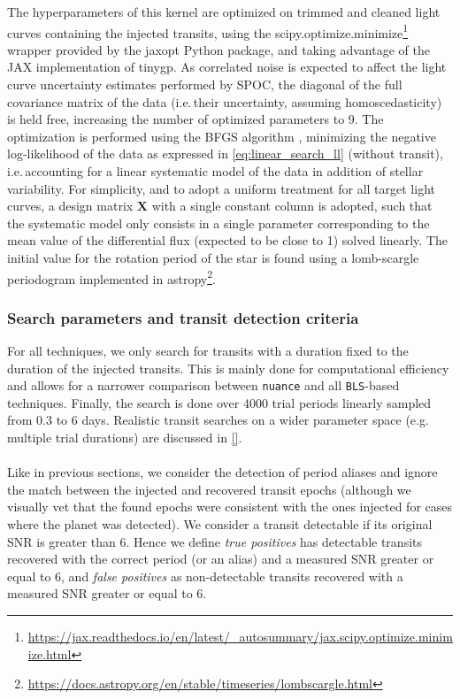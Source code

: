 \documentclass[modern]{aastex631}
\newcommand{\footlink}[1]{\footnote{\url{#1}}}
\begin{document}
The hyperparameters of this kernel are optimized on trimmed and cleaned light curves containing the injected transits, using the \textsf{scipy.optimize.minimize}\footlink{https://jax.readthedocs.io/en/latest/_autosummary/jax.scipy.optimize.minimize.html} wrapper provided by the \textsf{jaxopt} Python package, and taking advantage of the \textsf{JAX} implementation of \textsf{tinygp}. As correlated noise is expected to affect the light curve uncertainty estimates performed by SPOC, the diagonal of the full covariance matrix of the data (i.e.\,their uncertainty, assuming homoscedasticity) is held free, increasing the number of optimized parameters to 9. The optimization is performed using the \textsf{BFGS} algorithm \citep{Fletcher1987}, minimizing the negative log-likelihood of the data as expressed in \autoref{eq:linear_search_ll} (without transit), i.e.\,accounting for a linear systematic model of the data in addition of stellar variability. For simplicity, and to adopt a uniform treatment for all target light curves, a design matrix $\bm{X}$ with a single constant column is adopted, such that the systematic model only consists in a single parameter corresponding to the mean value of the differential flux (expected to be close to 1) solved linearly. The initial value for the rotation period of the star is found using a lomb-scargle periodogram \citep{Lomb1976, Scargle1982} implemented in \textsf{astropy}\footlink{https://docs.astropy.org/en/stable/timeseries/lombscargle.html}.

\subsubsection*{Search parameters and transit detection criteria}
For all techniques, we only search for transits with a duration fixed to the duration of the injected transits. This is mainly done for computational efficiency and allows for a narrower comparison between \texttt{nuance} and all \texttt{BLS}-based techniques. Finally, the search is done over 4000 trial periods linearly sampled from 0.3 to 6 days. Realistic transit searches on a wider parameter space (e.g. multiple trial durations) are discussed in \autoref{}.\\\\
Like in previous sections, we consider the detection of period aliases and ignore the match between the injected and recovered transit epochs (although we visually vet that the found epochs were consistent with the ones injected for cases where the planet was detected). We consider a transit detectable if its original SNR is greater than 6. Hence we define \textit{true positives} has detectable transits recovered with the correct period (or an alias) and a measured SNR greater or equal to 6, and \textit{false positives} as non-detectable transits recovered with a measured SNR greater or equal to 6.
\end{document}
